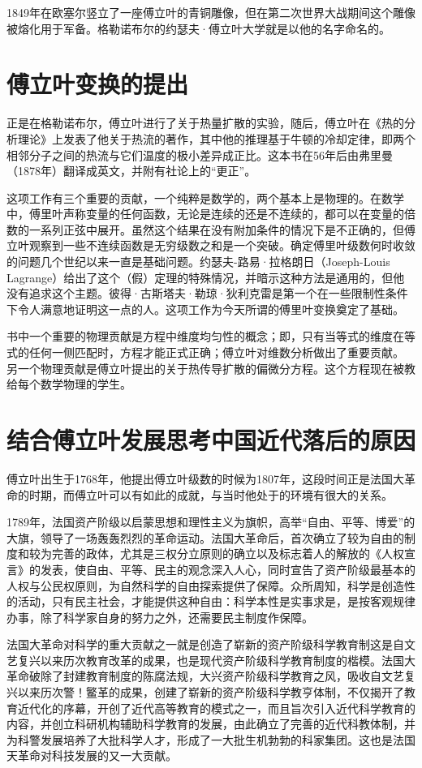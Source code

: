 \documentclass{../source/Paper}
\begin{document}
    1849年在欧塞尔竖立了一座傅立叶的青铜雕像，但在第二次世界大战期间这个雕像被熔化用于军备。格勒诺布尔的约瑟夫·傅立叶大学就是以他的名字命名的。


    \section{傅立叶变换的提出}

    正是在格勒诺布尔，傅立叶进行了关于热量扩散的实验，随后，傅立叶在《热的分析理论》上发表了他关于热流的著作，其中他的推理基于牛顿的冷却定律，即两个相邻分子之间的热流与它们温度的极小差异成正比。这本书在56年后由弗里曼（1878年）翻译成英文，并附有社论上的“更正”。

    这项工作有三个重要的贡献，一个纯粹是数学的，两个基本上是物理的。在数学中，傅里叶声称变量的任何函数，无论是连续的还是不连续的，都可以在变量的倍数的一系列正弦中展开。虽然这个结果在没有附加条件的情况下是不正确的，但傅立叶观察到一些不连续函数是无穷级数之和是一个突破。确定傅里叶级数何时收敛的问题几个世纪以来一直是基础问题。约瑟夫-路易·拉格朗日（Joseph-Louis
    Lagrange）给出了这个（假）定理的特殊情况，并暗示这种方法是通用的，但他没有追求这个主题。彼得·古斯塔夫·勒琼·狄利克雷是第一个在一些限制性条件下令人满意地证明这一点的人。这项工作为今天所谓的傅里叶变换奠定了基础。

    书中一个重要的物理贡献是方程中维度均匀性的概念；即，只有当等式的维度在等式的任何一侧匹配时，方程才能正式正确；傅立叶对维数分析做出了重要贡献。
    另一个物理贡献是傅立叶提出的关于热传导扩散的偏微分方程。这个方程现在被教给每个数学物理的学生。


    \section{结合傅立叶发展思考中国近代落后的原因}

    傅立叶出生于1768年，他提出傅立叶级数的时候为1807年，这段时间正是法国大革命的时期，而傅立叶可以有如此的成就，与当时他处于的环境有很大的关系。

    1789年，法国资产阶级以启蒙思想和理性主义为旗帜，⾼举``⾃由、平等、博爱''的⼤旗，领导了⼀场轰轰烈烈的⾰命运动。法国⼤⾰命后，⾸次确⽴了较为⾃由的制度和较为完善的政体，尤其是三权分⽴原则的确⽴以及标志着⼈的解放的《⼈权宣⾔》的发表，使⾃由、平等、民主的观念深⼊⼈⼼，同时宣告了资产阶级最基本的⼈权与公民权原则，为⾃然科学的⾃由探索提供了保障。众所周知，科学是创造性的活动，只有民主社会，才能提供这种⾃由：科学本性是实事求是，是按客观规律办事，除了科学家⾃⾝的努⼒之外，还需要民主制度作保障。

    法国⼤⾰命对科学的重⼤贡献之⼀就是创造了崭新的资产阶级科学教育制这是⾃⽂艺复兴以来历次教育改⾰的成果，也是现代资产阶级科学教育制度的楷模。法国⼤⾰命破除了封建教育制度的陈腐法规，⼤兴资产阶级科学教育之风，吸收⾃⽂艺复兴以来历次警！鳘⾰的成果，创建了崭新的资产阶级科学教亨体制，不仅揭开了教育近代化的序幕，开创了近代⾼等教育的模式之⼀，⽽且旨次引⼊近代科学教育的内容，并创⽴科研机构辅助科学教育的发展，由此确⽴了完善的近代科教体制，并为科警发展培养了⼤批科学⼈才，形成了⼀⼤批⽣机勃勃的科家集团。这也是法国天⾰命对科技发展的⼜⼀⼤贡献。
\end{document}
